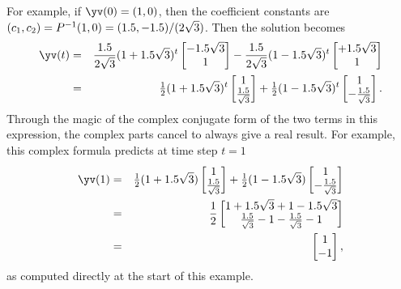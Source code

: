 \begin{example}
\begin{solution}
For example, if \(\yv(0)=(1,0)\), then the coefficient constants are \((c_1,c_2)=P^{-1}(1,0)=(1.5,-1.5)/(2\sqrt3)\).
Then the solution becomes
\begin{eqnarray*}
\yv(t)&=&\frac \i{2\sqrt3}(1+\i\sqrt3)^t\begin{bmatrix} -\i\sqrt3\\1 \end{bmatrix}
-\frac{\i}{2\sqrt3}(1-\i\sqrt3)^t\begin{bmatrix} +\i\sqrt3\\1 \end{bmatrix}
\\&=&\tfrac 12(1+\i\sqrt3)^t\begin{bmatrix} 1\\\frac \i{\sqrt3} \end{bmatrix}
+\tfrac12(1-\i\sqrt3)^t\begin{bmatrix} 1\\-\frac \i{\sqrt3} \end{bmatrix}.
\end{eqnarray*}
Through the magic of the complex conjugate form of the two terms in this expression, the complex parts cancel to always give a real result.
For example, this complex formula predicts at time step \(t=1\)
\begin{eqnarray*}
\yv(1)&=&\tfrac 12(1+\i\sqrt3)\begin{bmatrix} 1\\\frac \i{\sqrt3} \end{bmatrix}
+\tfrac12(1-\i\sqrt3)\begin{bmatrix} 1\\-\frac \i{\sqrt3} \end{bmatrix}
\\&=&\frac12\begin{bmatrix} 1+\i\sqrt3+1-\i\sqrt3\\
\frac \i{\sqrt3}-1-\frac \i{\sqrt3}-1 \end{bmatrix}
\\&=&\begin{bmatrix} 1\\-1 \end{bmatrix},
\end{eqnarray*}
as computed directly at the start of this example.
\end{solution}
\end{example}

